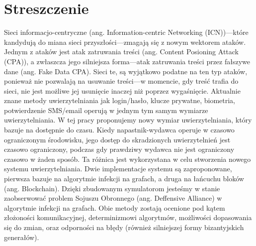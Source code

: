 \chapter*{Streszczenie}
Sieci informacjo-centryczne (ang. Information-centric Networking (ICN))––które kandydują do miana sieci przyszłości––zmagają się z nowym wektorem ataków. Jednym z ataków jest atak zatruwania treści (ang. Content Posioning Attack (CPA)), a zwłaszcza jego silniejsza forma––atak zatruwania treści przez fałszywe dane (ang. Fake Data CPA). Sieci te, są wyjątkowo podatne na ten typ ataków, ponieważ nie pozwalają na usuwanie treści––w momencie, gdy treść trafia do sieci, nie jest możliwe jej usunięcie inaczej niż poprzez wygaśnięcie.
Aktualnie znane metody uwierzytelniania jak login/hasło, klucze prywatne, biometria, potwierdzenie SMS/email operują w jednym tym samym wymiarze uwierzytelniania. W tej pracy proponujemy nowy wymiar uwierzytelniania, który bazuje na dostępnie do czasu. Kiedy napastnik-wydawca operuje w czasowo ograniczonym środowisku, jego dostęp do skradzionych uwierzytelnień jest czasowo ograniczony, podczas gdy prawdziwy wydawca nie jest ograniczony czasowo w żaden sposób. Ta różnica jest wykorzystana w celu stworzenia nowego systemu uwierzytelniania.
Dwie implementacje systemu są zaproponowane, pierwsza bazuje na algorytmie infekcji na grafach, a druga na łańcuchu bloków (ang. Blockchain). Dzięki zbudowanym symulatorom jesteśmy w stanie zaobserwować problem Sojuszu Obronnego (ang. Deffensive Alliance) w algorytmie infekcji na grafach.
Obie metody zostają ocenione pod kątem złożoności komunikacyjnej, determinizmowi algorytmów, możliwości dopasowania się do zmian, oraz odporności na błędy (również silniejszej formy bizantyjskich generałów).